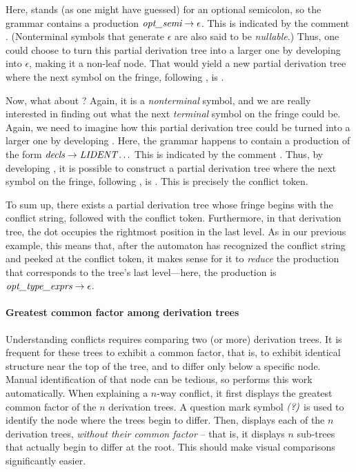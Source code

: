 \documentclass[onecolumn,11pt,nocopyrightspace,preprint]{sigplanconf}
\begin{document}
Here,  stands (as one might have guessed) for an optional
semicolon, so the grammar contains a production $\textit{opt\_semi} \rightarrow
\epsilon$. This is indicated by the comment
. (Nonterminal symbols
that generate $\epsilon$ are also said to be \emph{nullable}.) Thus, one could
choose to turn this partial derivation tree into a larger one by developing
 into $\epsilon$, making it a non-leaf node. That would yield
a new partial derivation tree where the next symbol on the fringe, following
, is .

Now, what about ? Again, it is a \emph{nonterminal} symbol, and we
are really interested in finding out what the next \emph{terminal} symbol on
the fringe could be. Again, we need to imagine how this partial derivation
tree could be turned into a larger one by developing . Here, the
grammar happens to contain a production of the form $\textit{decls} \rightarrow
\textit{LIDENT} \ldots$ This is indicated by the comment
.
Thus, by developing , it is possible to construct a partial
derivation tree where the next symbol on the fringe, following
, is . This is precisely the conflict
token.

To sum up, there exists a partial derivation tree whose
fringe begins with the conflict string, followed with the conflict token.
Furthermore, in that derivation tree, the dot occupies the rightmost position
in the last level. As in our previous example, this means that, after the
automaton has recognized the conflict string and peeked at the conflict token,
it makes sense for it to \emph{reduce} the production that corresponds to the
tree's last level---here, the production is $\textit{opt\_type\_exprs}
\rightarrow \epsilon$.

\paragraph{Greatest common factor among derivation trees}

Understanding conflicts requires comparing two (or more) derivation trees. It
is frequent for these trees to exhibit a common factor, that is, to exhibit
identical structure near the top of the tree, and to differ only below a
specific node. Manual identification of that node can be tedious, so \menhir
performs this work automatically. When explaining a $n$-way conflict, it first
displays the greatest common factor of the $n$ derivation trees. A question
mark symbol $\textit{(?)}$ is used to identify the node where the trees begin
to differ. Then, \menhir displays each of the $n$ derivation trees,
\emph{without their common factor} -- that is, it displays $n$ sub-trees that
actually begin to differ at the root. This should make visual comparisons
significantly easier.
\end{document}
